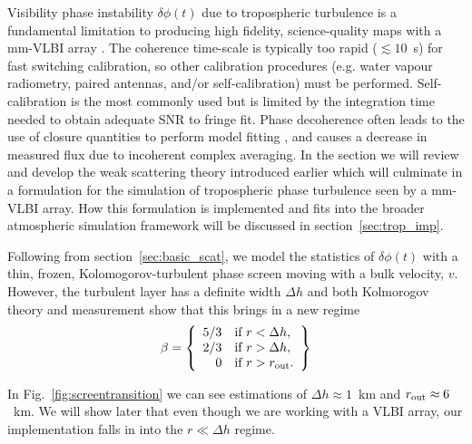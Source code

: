 Visibility phase instability  $\delta \phi(t)$ due to tropospheric turbulence is a fundamental limitation to producing high fidelity, science-quality maps with a mm-VLBI array \citep{Thompson_2001}. The coherence time-scale is typically too rapid ($\lesssim10$~s) for fast switching calibration, so other calibration procedures (e.g. water vapour radiometry, paired antennas, and/or self-calibration) must be performed. Self-calibration is the most commonly used but is limited by the integration time needed to obtain adequate SNR to fringe fit. Phase decoherence often leads to the use of closure quantities to perform model fitting \citep{Doeleman_2001,Bower_2004, Shen_2005}, and causes a decrease in measured flux due to incoherent complex averaging.
In the section we will review and develop the weak scattering theory introduced earlier which will culminate in a formulation for the simulation of tropospheric phase turbulence seen by a mm-VLBI array. How this formulation is implemented and fits into the broader atmospheric simulation framework will be discussed in section~\ref{sec:trop_imp}. 


Following from section~\ref{sec:basic_scat}, we model the statistics of $\delta \phi(t)$ with a thin, frozen, Kolomogorov-turbulent phase screen moving with a bulk velocity, $v$. 
However, the turbulent layer has a definite width $\Delta h$ and both Kolmorogov theory and measurement \citep[Fig.~\ref{fig:screentransition},][]{Coulman_1985, Treuhaft_1987, Carilli_1997} show that this brings in a new regime
\begin{equation}
 \beta = \left\{
 \begin{array}{rl}
 5/3 & \text{if } r < \Delta h,\\
2/3 & \text{if } r > \Delta h,\\
0 & \text{if } r > r_{\rm out}.
 \end{array}
\right\}
\end{equation}

In Fig.~\ref{fig:screentransition} we can see estimations of $\Delta h \approx 1$~km and $r_{\rm out} \approx 6$~km. We will show later that even though we are working with a VLBI array, our implementation falls in into the $r \ll \Delta h$ regime.


